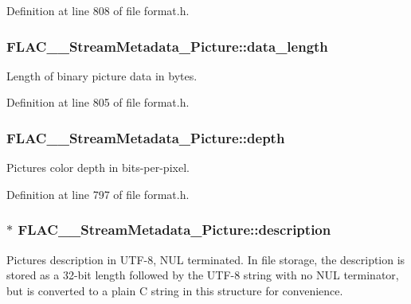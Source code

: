 Definition at line 808 of file format.\+h.

\subsubsection[{\texorpdfstring{data\+\_\+length}{data_length}}]{ F\+L\+A\+C\+\_\+\+\_\+\+Stream\+Metadata\+\_\+\+Picture\+::data\+\_\+length}\hypertarget{struct_f_l_a_c_____stream_metadata___picture_acb893f63a196f70263468770a90580a4}{}\label{struct_f_l_a_c_____stream_metadata___picture_acb893f63a196f70263468770a90580a4}
Length of binary picture data in bytes. 

Definition at line 805 of file format.\+h.

\subsubsection[{\texorpdfstring{depth}{depth}}]{ F\+L\+A\+C\+\_\+\+\_\+\+Stream\+Metadata\+\_\+\+Picture\+::depth}\hypertarget{struct_f_l_a_c_____stream_metadata___picture_a0f2092ddf28a6803e9c8adb7328c1967}{}\label{struct_f_l_a_c_____stream_metadata___picture_a0f2092ddf28a6803e9c8adb7328c1967}
Picture\textquotesingle{}s color depth in bits-\/per-\/pixel. 

Definition at line 797 of file format.\+h.

\subsubsection[{\texorpdfstring{description}{description}}]{$\ast$ F\+L\+A\+C\+\_\+\+\_\+\+Stream\+Metadata\+\_\+\+Picture\+::description}\hypertarget{struct_f_l_a_c_____stream_metadata___picture_a5bbfb168b265edfb0b29cfdb71fb413c}{}\label{struct_f_l_a_c_____stream_metadata___picture_a5bbfb168b265edfb0b29cfdb71fb413c}
Picture\textquotesingle{}s description in U\+T\+F-\/8, N\+UL terminated. In file storage, the description is stored as a 32-\/bit length followed by the U\+T\+F-\/8 string with no N\+UL terminator, but is converted to a plain C string in this structure for convenience. 

